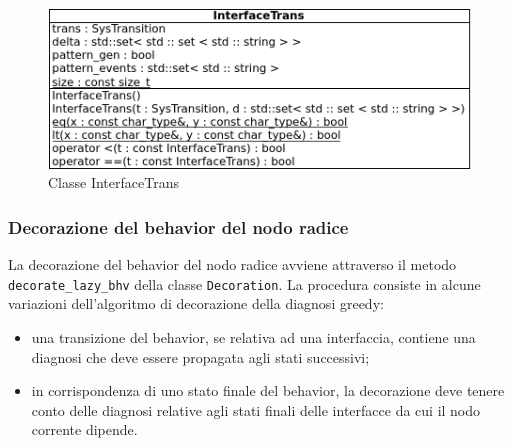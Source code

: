 \begin{figure}[htbp]
\centering
\includegraphics[scale=0.7]{./Img/implementazione/int_trans.png}
\caption{Classe InterfaceTrans}
\label{fig:int_trans}
\end{figure}

\subsubsection{Decorazione del behavior del nodo radice}
La decorazione del behavior del nodo radice avviene attraverso il metodo \verb|decorate_lazy_bhv| della classe \verb|Decoration|. La procedura consiste in alcune variazioni dell'algoritmo di decorazione della diagnosi greedy:
\begin{itemize}
\item una transizione del behavior, se relativa ad una interfaccia, contiene una diagnosi che deve essere propagata agli stati successivi;
\item in corrispondenza di uno stato finale del behavior, la decorazione deve tenere conto delle diagnosi relative agli stati finali delle interfacce da cui il nodo corrente dipende.
\end{itemize}